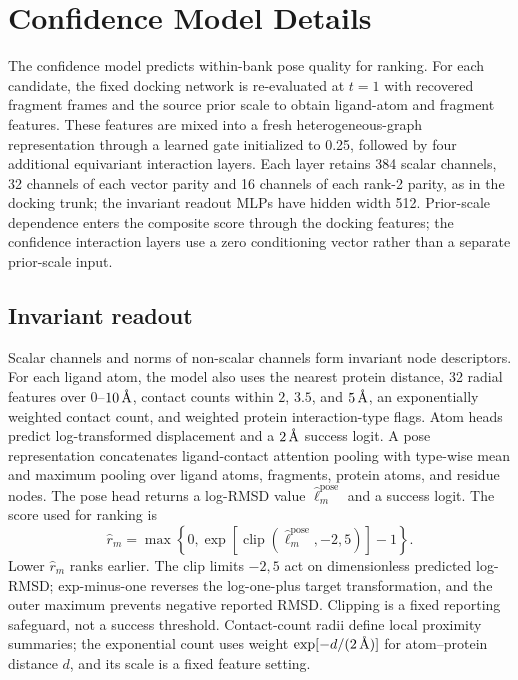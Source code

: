 \documentclass{article}
\newcommand{\angstrom}{\text{\normalfont\AA}}
\begin{document}
\section{Confidence Model Details}
\label{app:confidence_details}

The confidence model predicts within-bank pose quality for ranking.
For each candidate, the fixed docking network is re-evaluated at $t=1$ with recovered fragment frames and the source prior scale to obtain ligand-atom and fragment features. These features are mixed into a fresh heterogeneous-graph representation through a learned gate initialized to 0.25, followed by four additional equivariant interaction layers. Each layer retains 384 scalar channels, 32 channels of each vector parity and 16 channels of each rank-2 parity, as in the docking trunk; the invariant readout MLPs have hidden width 512. Prior-scale dependence enters the composite score through the docking features; the confidence interaction layers use a zero conditioning vector rather than a separate prior-scale input.

\subsection{Invariant readout}

Scalar channels and norms of non-scalar channels form invariant node descriptors.
For each ligand atom, the model also uses the nearest protein distance, 32 radial features over \(0\)--\(10\,\angstrom\), contact counts within \(2\), \(3.5\), and \(5\,\angstrom\), an exponentially weighted contact count, and weighted protein interaction-type flags.
Atom heads predict log-transformed displacement and a \(2\,\angstrom\) success logit.
A pose representation concatenates ligand-contact attention pooling with type-wise mean and maximum pooling over ligand atoms, fragments, protein atoms, and residue nodes.
The pose head returns a log-RMSD value \(\widehat\ell_m^{\mathrm{pose}}\) and a success logit.
The score used for ranking is
\begin{equation}
\widehat r_m
=
\max\left\{0,
\exp\left[
\operatorname{clip}(\widehat\ell_m^{\mathrm{pose}},-2,5)
\right]-1
\right\}.
\label{eq:confidence_reported_rmsd}
\end{equation}
Lower \(\widehat r_m\) ranks earlier.
The clip limits \(-2,5\) act on dimensionless predicted log-RMSD; exp-minus-one reverses the log-one-plus target transformation, and the outer maximum prevents negative reported RMSD. Clipping is a fixed reporting safeguard, not a success threshold. Contact-count radii define local proximity summaries; the exponential count uses weight \(\exp[-d/(2\,\angstrom)]\) for atom--protein distance \(d\), and its scale is a fixed feature setting.
\end{document}
